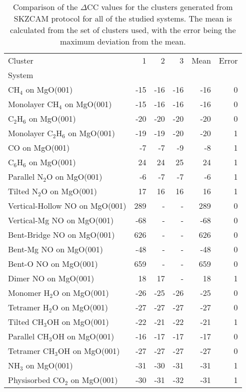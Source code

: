 \begin{table}
\caption{\label{tab:deltacc}Comparison of the $\Delta$CC values for the clusters generated from SKZCAM protocol for all of the studied systems. The mean is calculated from the set of clusters used, with the error being the maximum deviation from the mean.}
\begin{adjustbox}{center,max width=1\textwidth}
\begin{tabular}{lrrrrr}
\toprule
Cluster & 1 & 2 & 3 & Mean & Error \\ 
System &  &  &  &  &  \\
\midrule
CH$_4$ on MgO(001) & -15 & -16 & -16 & -16 & 0 \\
Monolayer CH$_4$ on MgO(001) & -15 & -16 & -16 & -16 & 0 \\
C$_2$H$_6$ on MgO(001) & -20 & -20 & -20 & -20 & 0 \\
Monolayer C$_2$H$_6$ on MgO(001) & -19 & -19 & -20 & -20 & 1 \\
CO on MgO(001) & -7 & -7 & -9 & -8 & 1 \\
C$_6$H$_6$ on MgO(001) & 24 & 24 & 25 & 24 & 1 \\
Parallel N$_2$O on MgO(001) & -6 & -7 & -7 & -6 & 1 \\
Tilted N$_2$O on MgO(001) & 17 & 16 & 16 & 16 & 1 \\
Vertical-Hollow NO on MgO(001) & 289 & - & - & 289 & 0 \\
Vertical-Mg NO on MgO(001) & -68 & - & - & -68 & 0 \\
Bent-Bridge NO on MgO(001) & 626 & - & - & 626 & 0 \\
Bent-Mg NO on MgO(001) & -48 & - & - & -48 & 0 \\
Bent-O NO on MgO(001) & 659 & - & - & 659 & 0 \\
Dimer NO on MgO(001) & 18 & 17 & - & 18 & 1 \\
Monomer H$_2$O on MgO(001) & -26 & -25 & -26 & -25 & 0 \\
Tetramer H$_2$O on MgO(001) & -27 & -27 & -27 & -27 & 0 \\
Tilted CH$_3$OH on MgO(001) & -22 & -21 & -22 & -21 & 1 \\
Parallel CH$_3$OH on MgO(001) & -16 & -17 & -17 & -17 & 0 \\
Tetramer CH$_3$OH on MgO(001) & -27 & -27 & -27 & -27 & 0 \\
NH$_3$ on MgO(001) & -31 & -30 & -31 & -31 & 1 \\
Physisorbed CO$_2$ on MgO(001) & -30 & -31 & -32 & -31 & 1 \\

\end{tabular}
\end{adjustbox}
\end{table}
